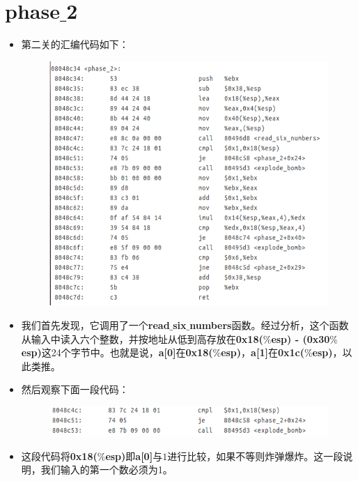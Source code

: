 \section{phase$\_$2}
	\begin{itemize}
	\item
	第二关的汇编代码如下：
	\begin{figure}[h]
		\centering
			\includegraphics[scale=0.77]{images/phase_2.png}
	\end{figure}
	
	\item
	我们首先发现，它调用了一个\textbf{read$\_$six$\_$numbers}函数。经过分析，这个函数从输入中读入六个整数，并按地址从低到高存放在\textbf{0x18($\%$esp) - (0x30$\%$esp)}这24个字节中。也就是说，\textbf{a[0]}在\textbf{0x18($\%$esp)}，\textbf{a[1]}在\textbf{0x1c($\%$esp)}，以此类推。
	
	\item
	然后观察下面一段代码：
	
	\begin{figure}[h]
		\centering
			\includegraphics[scale=0.77]{images/phase_2_part_0.png}
	\end{figure}
	
	\item
	这段代码将\textbf{0x18($\%$esp)}即\textbf{a[0]}与$1$进行比较，如果不等则炸弹爆炸。这一段说明，我们输入的第一个数必须为1。
	

\end{itemize}
